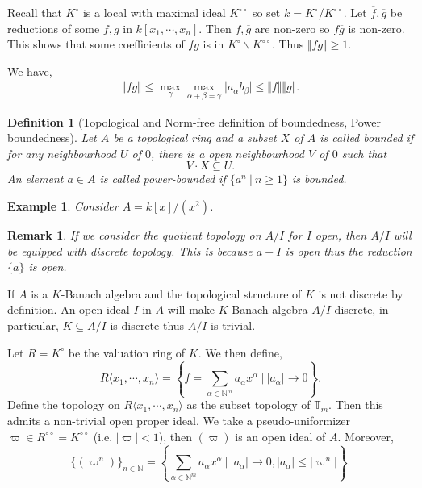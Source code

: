 \documentclass[10pt]{article}
\numberwithin{equation}{section}
\newtheorem{definition}{Definition}[section]
\newtheorem{remark}{Remark}[section]
\newtheorem{example}{Example}[section]
\newcommand{\norm}[1]{\Vert #1 \Vert}
\newcommand{\N}[0]{\mathbb{N}}
\newcommand{\T}[0]{\mathbb{T}}
\newcommand{\sep}[0]{\:|\:}
\begin{document}
Recall that $K^\circ$ is a local with maximal ideal $K^{\circ\circ}$ so set $k=K^\circ/K^{\circ\circ}$. Let $\overline{f},\overline{g}$ be reductions of some $f,g$ in $k[x_1,\cdots,x_n]$. Then $\overline{f},\overline{g}$ are non-zero so $\overline{f}\overline{g}$ is non-zero.
This shows that some coefficients of $fg$ is in $K^\circ\backslash K^{\circ\circ}$. Thus $\norm{fg}\geq1$. 
\par We have,
\begin{align*}
  \norm{fg}\leq\max_{\gamma}\max_{\alpha+\beta=\gamma}\vert a_\alpha b_\beta\vert\leq \norm{f}\norm{g}.
\end{align*}
\begin{definition}[Topological and Norm-free definition of boundedness, Power boundedness]
  Let $A$ be a topological ring and a subset $X$ of $A$ is called bounded if for any neighbourhood $U$ of $0$, there is a open neighbourhood $V$ of $0$ such that 
  \begin{equation*}
    V\cdot X \subseteq U.
  \end{equation*}
    An element $a\in A$ is called power-bounded if $\{a^n\sep n\geq1\}$ is bounded.
\end{definition}
\begin{example}
  Consider $A=k[x]/(x^2)$. 
\end{example}
\begin{remark}
  If we consider the quotient topology on $A/I$ for $I$ open, then $A/I$ will be equipped with discrete topology. This is because $a+I$ is open thus the reduction $\{\overline{a}\}$ is open.
\end{remark}
If $A$ is a $K$-Banach algebra and the topological structure of $K$ is not discrete by definition. An open ideal $I$ in $A$ will make $K$-Banach algebra $A/I$ discrete, in particular, $K\subseteq A/I$ is discrete thus $A/I$ is trivial.
\par Let $R=K^\circ$ be the valuation ring of $K$. We then define,
\begin{equation*}
  R\langle x_1,\cdots,x_n\rangle = \left\{f=\sum_{\alpha\in\N^m}a_\alpha x^\alpha\sep \vert a_\alpha\vert \to 0\right\}.
\end{equation*}
Define the topology on $R\langle x_1,\cdots,x_n\rangle$ as the subset topology of $\T_m$. Then this admits a non-trivial open proper ideal. We take a pseudo-uniformizer $\varpi\in R^{\circ\circ}=K^{\circ\circ}$ (i.e. $\vert\varpi\vert<1$), then $(\varpi)$ is an open ideal of $A$. Moreover,
\begin{equation*}
  \{(\varpi^n)\}_{n\in\N}=\left\{\sum_{\alpha\in\N^m}a_\alpha x^\alpha\sep \vert a_\alpha\vert\to 0 ,\vert a_\alpha\vert \leq\vert \varpi^n\vert \right\}.
\end{equation*} 
\end{document}
